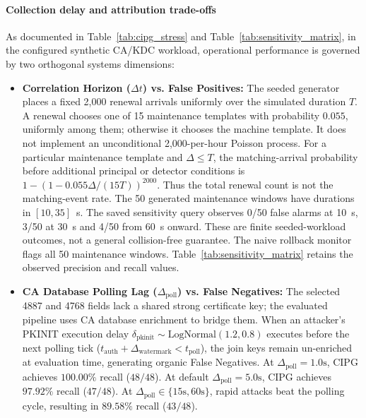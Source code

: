 \paragraph{Collection delay and attribution trade-offs}
As documented in Table~\ref{tab:cipg_stress} and Table~\ref{tab:sensitivity_matrix}, in the configured synthetic CA/KDC workload, operational performance is governed by two orthogonal systems dimensions:
\begin{itemize}
    \item \textbf{Correlation Horizon ($\Delta t$) vs. False Positives:} The seeded generator places a fixed 2,000 renewal arrivals uniformly over the simulated duration $T$. A renewal chooses one of 15 maintenance templates with probability $0.055$, uniformly among them; otherwise it chooses the machine template. It does not implement an unconditional 2,000-per-hour Poisson process. For a particular maintenance template and $\Delta\le T$, the matching-arrival probability before additional principal or detector conditions is $1-(1-0.055\Delta/(15T))^{2000}$. Thus the total renewal count is not the matching-event rate. The 50 generated maintenance windows have durations in $[10,35]$~s. The saved sensitivity query observes 0/50 false alarms at 10~s, 3/50 at 30~s and 4/50 from 60~s onward. These are finite seeded-workload outcomes, not a general collision-free guarantee. The naive rollback monitor flags all 50 maintenance windows. Table~\ref{tab:sensitivity_matrix} retains the observed precision and recall values.
    \item \textbf{CA Database Polling Lag ($\Delta_{\text{poll}}$) vs. False Negatives:} The selected 4887 and 4768 fields lack a shared strong certificate key; the evaluated pipeline uses CA database enrichment to bridge them. When an attacker's PKINIT execution delay $\delta_{\text{pkinit}} \sim \text{LogNormal}(1.2, 0.8)$ executes before the next polling tick ($t_{\text{auth}} + \Delta_{\text{watermark}} < t_{\text{poll}}$), the join keys remain un-enriched at evaluation time, generating organic False Negatives. At $\Delta_{\text{poll}} = 1.0\text{s}$, CIPG achieves $100.00\%$ recall ($48/48$). At default $\Delta_{\text{poll}} = 5.0\text{s}$, CIPG achieves $97.92\%$ recall ($47/48$). At $\Delta_{\text{poll}} \in \{15\text{s}, 60\text{s}\}$, rapid attacks beat the polling cycle, resulting in $89.58\%$ recall ($43/48$).
\end{itemize}

